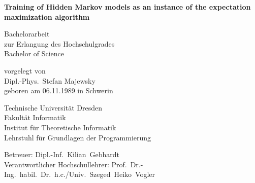 \documentclass[
 paper=A4,pagesize=automedia,fontsize=11pt,
 BCOR=10mm,DIV=16,
 twoside,headinclude,footinclude=false,
 bibtotocnumbered,          %
 liststotoc,                %
 listsleft,
 pointlessnumbers,          %
 cleardoublepage=empty      %
]{scrbook}
\theoremstyle{definition}
\numberwithin{theorem}{chapter}
\numberwithin{equation}{chapter}
\numberwithin{figure}{chapter}
\numberwithin{table}{chapter}
\begin{document}
\frontmatter

\begin{titlepage}
 \begin{center}
  \vspace*{5em}

  \begin{singlespace}\bfseries\Huge
   Training of Hidden Markov models as an instance of the expectation maximization algorithm
  \end{singlespace}

  \vspace*{5em}

  \begin{singlespace}\large
   Bachelorarbeit \\ zur Erlangung des Hochschulgrades \\ Bachelor of Science
  \end{singlespace}\medskip

  \vspace*{4em}

  vorgelegt von \\
  {\large Dipl.-Phys.~Stefan Majewsky} \\
  geboren am 06.11.1989 in Schwerin

  \vspace*{4em}

  \begin{singlespace}\large
   Technische Universität Dresden \\
   Fakultät Informatik \\
   Institut für Theoretische Informatik \\
   Lehrstuhl für Grundlagen der Programmierung
  \end{singlespace}

  \vspace*{4em}

  \begin{singlespace}
   Betreuer: Dipl.-Inf.~Kilian~Gebhardt \\
   Verantwortlicher Hochschullehrer: Prof.~Dr.-Ing.~habil.~Dr.~h.c./Univ.~Szeged~Heiko~Vogler
  \end{singlespace}

 \end{center}


\end{titlepage}
\end{document}
